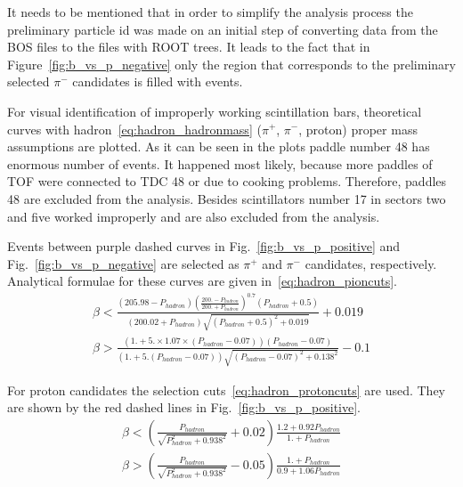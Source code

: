 It needs to be mentioned that in order to simplify the analysis process the preliminary particle id was made on an initial step of converting data from the BOS files to the files with ROOT trees. It leads to the fact that in 
Figure~\ref{fig:b_vs_p_negative} only the region that corresponds to the preliminary selected $\pi^{-}$ candidates is filled with events.

For visual identification of improperly working scintillation bars, theoretical curves with hadron~\ref{eq:hadron_hadronmass} ($\pi^{+}$, $\pi^{-}$, proton) proper mass assumptions are plotted. As it can be seen in the plots paddle number 48 has enormous number of events. It happened most likely, because more paddles of TOF were connected to TDC 48 or due to cooking problems. Therefore, paddles 48 are excluded from the analysis. Besides scintillators number 17 in sectors two and five worked improperly and are also excluded from the analysis. 

Events between purple dashed curves in Fig.~\ref{fig:b_vs_p_positive} and Fig.~\ref{fig:b_vs_p_negative} are selected as $\pi^{+}$ and $\pi^{-}$ candidates, respectively. Analytical formulae for these curves are given in~\ref{eq:hadron_pioncuts}.
\begin{equation}
\begin{aligned}
\beta <
\frac{(205.98-P_{hadron})\left(\frac{200.-P_{hadron}}{200.+P_{hadron}}\right)^{0.7}(P_{hadron}+0.5)}
{(200.02+P_{hadron})\sqrt{(P_{hadron}+0.5)^{2}+0.019}} + 0.019 \\
\beta > \frac{(1.+5.\times1.07\times(P_{hadron}-0.07))(P_{hadron}-0.07)}
{(1.+5.(P_{hadron}-0.07))\sqrt{(P_{hadron}-0.07)^{2}+0.138^{2}}} - 0.1
\label{eq:hadron_pioncuts}
\end{aligned}
\end{equation}

For proton candidates the selection cuts~\ref{eq:hadron_protoncuts} are used. They are shown by the red dashed lines in Fig.~\ref{fig:b_vs_p_positive}. 
\begin{equation}
\begin{aligned}
\beta <
\left(\frac{P_{hadron}}{\sqrt{P_{hadron}^{2}+0.938^{2}}}+0.02\right)\frac{1.2+0.92P_{hadron}}{1.+P_{hadron}}
\label{eq:hadron_protoncuts} \\
\beta > \left(\frac{P_{hadron}}{\sqrt{P_{hadron}^{2}+0.938^{2}}}-0.05\right)
\frac{1.+P_{hadron}}{0.9+1.06P_{hadron}} 
\end{aligned}
\end{equation}

